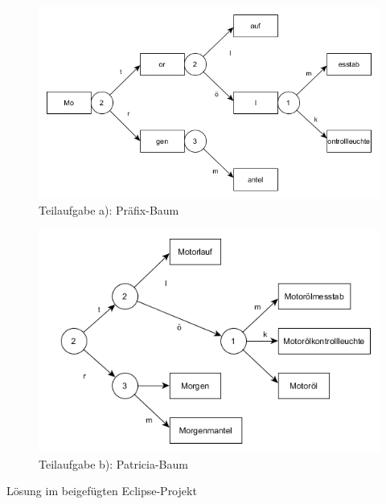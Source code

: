 \documentclass[12pt]{scrartcl}
\begin{document}
\exercise{}
\begin{figure}[h!]
\begin{center}
\includegraphics[scale=0.5]{Prefix-Tree.png}
\caption{Teilaufgabe a): Präfix-Baum}
\end{center}
\end{figure}

\exercise{}
\begin{figure}[h!]
\begin{center}
\includegraphics[scale=0.5]{Patricia-Tree.png}
\caption{Teilaufgabe b): Patricia-Baum}
\end{center}
\end{figure}


\exercise{}
Lösung im beigefügten Eclipse-Projekt



\end{document}

